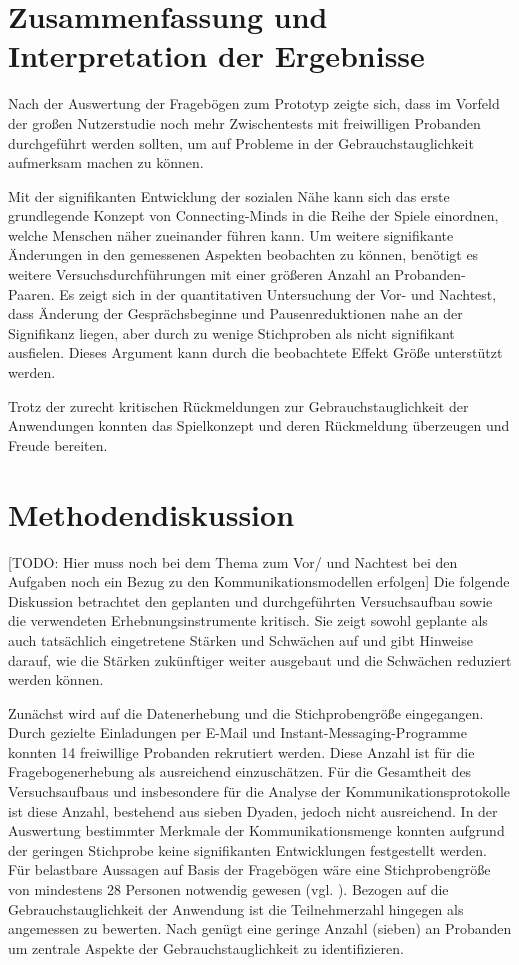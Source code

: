 \section{Zusammenfassung und Interpretation der Ergebnisse}
Nach der Auswertung der Fragebögen zum Prototyp zeigte sich, dass im Vorfeld der großen Nutzerstudie noch mehr Zwischentests mit freiwilligen Probanden durchgeführt werden sollten, um auf Probleme in der Gebrauchstauglichkeit aufmerksam machen zu können. 

Mit der signifikanten Entwicklung der sozialen Nähe kann sich das erste grundlegende Konzept von Connecting-Minds in die Reihe der Spiele einordnen, welche Menschen näher zueinander führen kann. Um weitere signifikante Änderungen in den gemessenen Aspekten beobachten zu können, benötigt es weitere Versuchsdurchführungen mit einer größeren Anzahl an Probanden-Paaren. Es zeigt sich in der quantitativen Untersuchung der Vor- und Nachtest, dass Änderung der Gesprächsbeginne und Pausenreduktionen nahe an der Signifikanz liegen, aber durch zu wenige Stichproben als nicht signifikant ausfielen. Dieses Argument kann durch die beobachtete Effekt Größe unterstützt werden. 

Trotz der zurecht kritischen Rückmeldungen zur Gebrauchstauglichkeit der Anwendungen konnten das Spielkonzept und deren Rückmeldung überzeugen und Freude bereiten.

\section{Methodendiskussion}
[TODO: Hier muss noch bei dem Thema zum Vor/ und Nachtest bei den Aufgaben noch ein Bezug zu den Kommunikationsmodellen erfolgen]
Die folgende Diskussion betrachtet den geplanten und durchgeführten Versuchsaufbau sowie die verwendeten Erhebnungsinstrumente kritisch. Sie zeigt sowohl geplante als auch tatsächlich eingetretene Stärken und Schwächen auf und gibt Hinweise darauf, wie die Stärken zukünftiger weiter ausgebaut und die Schwächen reduziert werden können.

Zunächst wird auf die Datenerhebung und die Stichprobengröße eingegangen.
Durch gezielte Einladungen per E-Mail und Instant-Messaging-Programme konnten 14 freiwillige Probanden rekrutiert werden. Diese Anzahl ist für die Fragebogenerhebung als ausreichend einzuschätzen. Für die Gesamtheit des Versuchsaufbaus und insbesondere für die Analyse der Kommunikationsprotokolle ist diese Anzahl, bestehend aus sieben Dyaden, jedoch nicht ausreichend. In der Auswertung bestimmter Merkmale der Kommunikationsmenge konnten aufgrund der geringen Stichprobe keine signifikanten Entwicklungen festgestellt werden. Für belastbare Aussagen auf Basis der Fragebögen wäre eine Stichprobengröße von mindestens 28 Personen notwendig gewesen (vgl. \cite[S. 158]{cohen_power_1992}). 
Bezogen auf die Gebrauchstauglichkeit der Anwendung ist die Teilnehmerzahl hingegen als angemessen zu bewerten. Nach \cite[S. 3088]{turner_determining_2006} genügt eine geringe Anzahl (sieben) an Probanden um zentrale Aspekte der Gebrauchstauglichkeit zu identifizieren.

